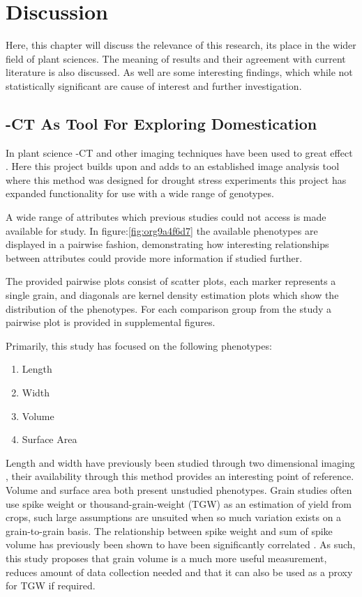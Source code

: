 \documentclass[11pt]{report}
\begin{document}
\clearpage
\chapter{Discussion}
\label{sec:org62f9fa1}

Here, this chapter will discuss the relevance of this research, its place in the wider field of plant sciences. The meaning of results and their agreement with current literature is also discussed. As well are some interesting findings, which while not statistically significant are cause of interest and further investigation.

\section{\textmu{}-CT As Tool For Exploring Domestication}
\label{sec:org35e1441}
In plant science \textmu{}-CT and other imaging techniques have been used to great effect \cite{Hubeau2015,Staedler2013,Metzner2015}. Here this project builds upon and adds to an established image analysis tool \cite{Hughes2017} where this method was designed for drought stress experiments this project has expanded functionality for use with a wide range of genotypes.

A wide range of attributes which previous studies could not access \cite{Gegas2010} is made available for study. In figure:\ref{fig:org9a4f6d7} the available phenotypes are displayed in a pairwise fashion, demonstrating how interesting relationships between attributes could provide more information if studied further.

The provided pairwise plots consist of scatter plots, each marker represents a single grain, and diagonals are kernel density estimation plots which show the distribution of the phenotypes. For each comparison group from the study a pairwise plot is provided in supplemental figures.

Primarily, this study has focused on the following phenotypes:

\begin{enumerate}
\item Length
\item Width
\item Volume
\item Surface Area
\end{enumerate}

Length and width have previously been studied through two dimensional imaging \cite{Gegas2010}, their availability through this method provides an interesting point of reference. Volume and surface area both present unstudied phenotypes. Grain studies often use spike weight or thousand-grain-weight (TGW) as an estimation of yield from crops, such large assumptions are unsuited when so much variation exists on a grain-to-grain basis. The relationship between spike weight and sum of spike volume has previously been shown to have been significantly correlated \cite{Hughes2017}. As such, this study proposes that grain volume is a much more useful measurement, reduces amount of data collection needed and that it can also be used as a proxy for TGW if required.
\end{document}
